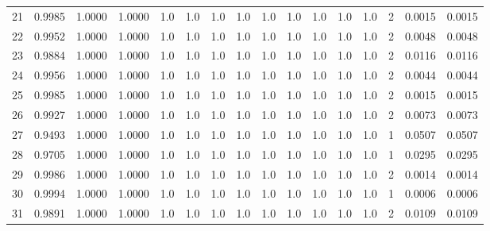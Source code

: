 \begin{tabular}{lrrrrrrrrrrrrrrr}
21  &      0.9985 &  1.0000 &  1.0000 &     1.0 &     1.0 &     1.0 &     1.0 &     1.0 &     1.0 &     1.0 &      1.0 &        1.0 &      2 &                    0.0015 &                     0.0015 \\
22  &      0.9952 &  1.0000 &  1.0000 &     1.0 &     1.0 &     1.0 &     1.0 &     1.0 &     1.0 &     1.0 &      1.0 &        1.0 &      2 &                    0.0048 &                     0.0048 \\
23  &      0.9884 &  1.0000 &  1.0000 &     1.0 &     1.0 &     1.0 &     1.0 &     1.0 &     1.0 &     1.0 &      1.0 &        1.0 &      2 &                    0.0116 &                     0.0116 \\
24  &      0.9956 &  1.0000 &  1.0000 &     1.0 &     1.0 &     1.0 &     1.0 &     1.0 &     1.0 &     1.0 &      1.0 &        1.0 &      2 &                    0.0044 &                     0.0044 \\
25  &      0.9985 &  1.0000 &  1.0000 &     1.0 &     1.0 &     1.0 &     1.0 &     1.0 &     1.0 &     1.0 &      1.0 &        1.0 &      2 &                    0.0015 &                     0.0015 \\
26  &      0.9927 &  1.0000 &  1.0000 &     1.0 &     1.0 &     1.0 &     1.0 &     1.0 &     1.0 &     1.0 &      1.0 &        1.0 &      2 &                    0.0073 &                     0.0073 \\
27  &      0.9493 &  1.0000 &  1.0000 &     1.0 &     1.0 &     1.0 &     1.0 &     1.0 &     1.0 &     1.0 &      1.0 &        1.0 &      1 &                    0.0507 &                     0.0507 \\
28  &      0.9705 &  1.0000 &  1.0000 &     1.0 &     1.0 &     1.0 &     1.0 &     1.0 &     1.0 &     1.0 &      1.0 &        1.0 &      1 &                    0.0295 &                     0.0295 \\
29  &      0.9986 &  1.0000 &  1.0000 &     1.0 &     1.0 &     1.0 &     1.0 &     1.0 &     1.0 &     1.0 &      1.0 &        1.0 &      2 &                    0.0014 &                     0.0014 \\
30  &      0.9994 &  1.0000 &  1.0000 &     1.0 &     1.0 &     1.0 &     1.0 &     1.0 &     1.0 &     1.0 &      1.0 &        1.0 &      1 &                    0.0006 &                     0.0006 \\
31  &      0.9891 &  1.0000 &  1.0000 &     1.0 &     1.0 &     1.0 &     1.0 &     1.0 &     1.0 &     1.0 &      1.0 &        1.0 &      2 &                    0.0109 &                     0.0109 \\

\end{tabular}
